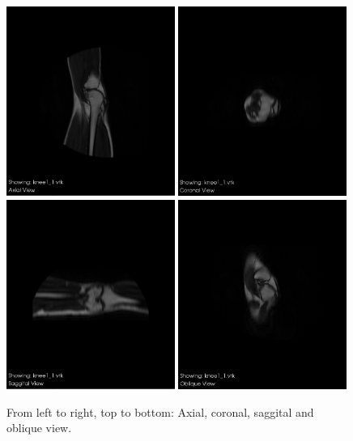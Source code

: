 \documentclass{article}
\begin{document}
\begin{figure}[H]
    \centering
    \includegraphics[width=0.49\textwidth]{graphics/axial.png}
    \includegraphics[width=0.49\textwidth]{graphics/coronal.png}
    \includegraphics[width=0.49\textwidth]{graphics/saggital.png}
    \includegraphics[width=0.49\textwidth]{graphics/oblique.png}
    \caption{From left to right, top to bottom: Axial, coronal, saggital and oblique view.}
    \label{fig:slicing}
\end{figure}
\end{document}

